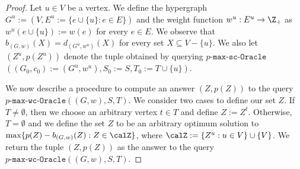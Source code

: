 \documentclass{article}
\newcommand{\functionMaximizationOracle}[1]{\ensuremath{{#1}\text{-}\mathtt{max}\text{-}\mathtt{wc}\text{-}\mathtt{Oracle}}\xspace}
\newcommand{\functionMaximizationOracleStrongCover}[1]{\ensuremath{{#1}\text{-}\mathtt{max}\text{-}\mathtt{sc}\text{-}\mathtt{Oracle}}\xspace}
\begin{document}
\begin{proof}
Let $u \in V$ be a vertex. We define the hypergraph $G^u := (V, E^u := \{e \cup \{u\} : e \in E\})$ and the weight function $w^u : E^u \rightarrow\Z_+$ as $w^u(e \cup \{u\}) := w(e)$ for every $e \in E$. We observe that $b_{(G, w)}(X) = d_{(G^u, w^u)}(X)$ for every set $X \subseteq V - \{u\}$. We also let $(Z^u, p(Z^u))$ denote the tuple obtained by querying \functionMaximizationOracleStrongCover{p}$((G_0, c_0) := (G^u, w^u), S_0 := S, T_0 := T\cup \{u\})$.

We now describe a procedure to compute an answer $(Z, p(Z))$ to the query $\functionMaximizationOracle{p}((G,w), S, T)$. We consider two cases to define our set $Z$. If $T \not= \emptyset$, then we choose an arbitrary vertex $t \in T$ and define $Z := Z^t$. Otherwise, $T = \emptyset$ and we define the set $Z$ to be an arbitrary optimum solution to $\max\{p(Z) - b_{(G, w)}(Z) : Z \in \calZ \}$, where $\calZ := \{Z^u: u \in V\} \cup \{ V\}$.  We return the tuple $(Z, p(Z))$ as the answer to the query $\functionMaximizationOracle{p}((G, w), S, T)$.


\end{proof}
\end{document}
